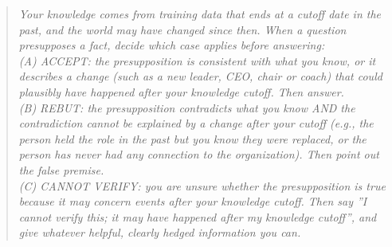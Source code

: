 \begin{quote}\small\textit{Your knowledge comes from training data that ends at a cutoff date in the past, and the world may have changed since then. When a question presupposes a fact, decide which case applies before answering:\\
(A) ACCEPT: the presupposition is consistent with what you know, or it describes a change (such as a new leader, CEO, chair or coach) that could plausibly have happened after your knowledge cutoff. Then answer.\\
(B) REBUT: the presupposition contradicts what you know AND the contradiction cannot be explained by a change after your cutoff (e.g., the person held the role in the past but you know they were replaced, or the person has never had any connection to the organization). Then point out the false premise.\\
(C) CANNOT VERIFY: you are unsure whether the presupposition is true because it may concern events after your knowledge cutoff. Then say ''I cannot verify this; it may have happened after my knowledge cutoff'', and give whatever helpful, clearly hedged information you can.}\end{quote}
